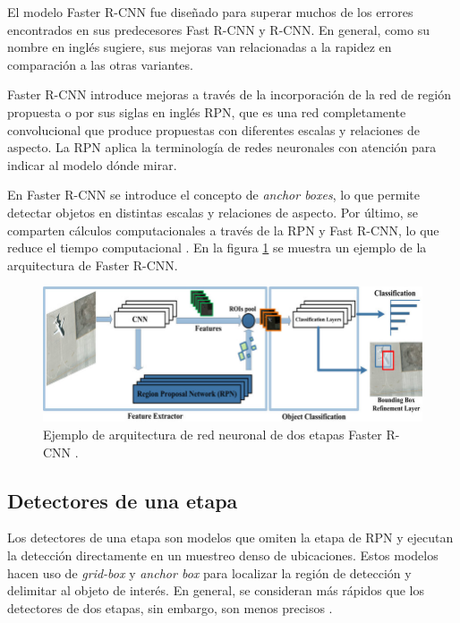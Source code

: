 El modelo Faster R-CNN fue diseñado para superar muchos de los errores encontrados en sus predecesores Fast R-CNN y R-CNN. En general, como su nombre en inglés sugiere, sus mejoras van relacionadas a la rapidez en comparación a las otras variantes.

Faster R-CNN introduce mejoras a través de la incorporación de la red de región propuesta o por sus siglas en inglés RPN, que es una red completamente convolucional que produce propuestas con diferentes escalas y relaciones de aspecto. La RPN aplica la terminología de redes neuronales con atención para indicar al modelo dónde mirar.

En Faster R-CNN se introduce el concepto de \textit{anchor boxes}, lo que permite detectar objetos en distintas escalas y relaciones de aspecto. Por último, se comparten cálculos computacionales a través de la RPN y Fast R-CNN, lo que reduce el tiempo computacional \cite{ARTICLE:9}. En la figura \ref{fig:Faster-rcnn} se muestra un ejemplo de la arquitectura de Faster R-CNN.

\begin{figure}[ht]
	\centering
	\includegraphics[scale=1.3]{./Figures/Faster-rcnn.png}
	\caption{Ejemplo de arquitectura de red neuronal de dos etapas Faster R-CNN \protect\footnotemark.} %
	\label{fig:Faster-rcnn}
\end{figure}


\subsection{Detectores de una etapa}

Los detectores de una etapa son modelos que omiten la etapa de RPN y ejecutan la detección directamente en un muestreo denso de ubicaciones. Estos modelos hacen uso de \textit{grid-box} y \textit{anchor box} para localizar la región de detección y delimitar al objeto de interés. En general, se consideran más rápidos que los detectores de dos etapas, sin embargo, son menos precisos \cite{ARTICLE:12}.

